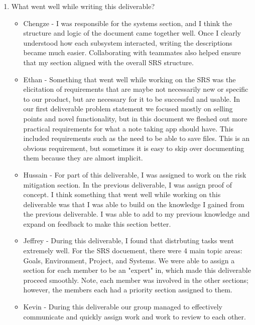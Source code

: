 \begin{enumerate}
  \item What went well while writing this deliverable?
  \begin{itemize}
        \item Chengze - I was responsible for the systems section, and 
        I think the structure and logic of the document came together 
        well. Once I clearly understood how each subsystem interacted, 
        writing the descriptions became much easier. Collaborating with 
        teammates also helped ensure that my section aligned with the 
        overall SRS structure.
        \item Ethan - Something that went well while working on the SRS was the
          elicitation of requirements that are maybe not necessarily new or
          specific to our product, but are necessary for it to be successful
          and usable. In our first deliverable problem statement we focused
          mostly on selling points and novel functionality, but in this
          document we fleshed out more practical requirements for what a note
          taking app should have. This included requirements such as the need
          to be able to save files. This is an obvious requirement, but
          sometimes it is easy to skip over documenting them because they are
          almost implicit.
        \item Hussain - For part of this deliverable, I was assigned to work on
         the risk mitigation section. In the previous deliverable, I was assign
         proof of concept. I think something that went well while working on
         this deliverable was that I was able to build on the knowledge I
         gained from the previous deliverable. I was able to add to my previous
         knowledge and expand on feedback to make this section better.
        \item Jeffrey - During this deliverable, I found that distrbuting tasks
        went extremely well. For the SRS docuement, there were 4 main topic areas:
        Goals, Environment, Project, and Systems. We were able to assign a 
        section for each member to be an "expert" in, which made this 
        deliverable proceed smoothly. Note, each member was involved in the 
        other sections; however, the members each had a priority section assigned 
        to them. 
        \item Kevin - During this deliverable our group managed to effectively 
        communicate and quickly assign work and work to review to each other.

\end{itemize}
\end{enumerate}
